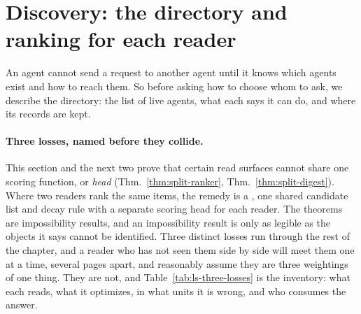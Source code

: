 \documentclass[11pt,a4paper]{article}
\theoremstyle{definition}
\theoremstyle{plain}
\begin{document}
\section{Discovery: the directory and ranking for each reader}\label{sec:discovery}

An agent cannot send a request to another agent until it knows which agents
exist and how to reach them. So before asking how to choose whom to ask, we
describe the directory: the list of live agents, what each says it can do, and
where its records are kept.

\paragraph{Three losses, named before they collide.} This section and the next
two prove that certain read surfaces cannot share one scoring function, or
\emph{head} (Thm.~\ref{thm:split-ranker}, Thm.~\ref{thm:split-digest}). Where
two readers rank the same items, the remedy is a , one
shared candidate list and decay rule with a separate scoring head for each
reader. The theorems are impossibility results, and an impossibility result is
only as legible as the objects it says cannot be identified. Three distinct losses run through the rest
of the chapter, and a reader who has not seen them side by side will meet them
one at a time, several pages apart, and reasonably assume they are three
weightings of one thing. They are not, and Table~\ref{tab:ls-three-losses} is
the inventory: what each reads, what it optimizes, in what units it is wrong,
and who consumes the answer.
\end{document}
